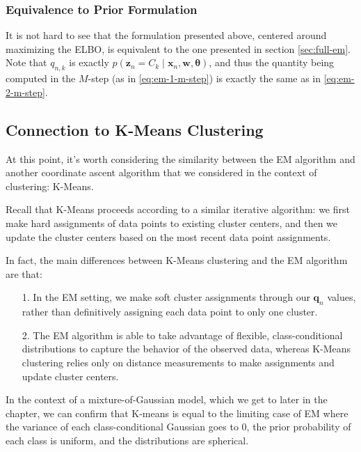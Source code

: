 
\subsubsection{Equivalence to Prior Formulation}

It is not hard to see that the formulation presented above, centered around maximizing the ELBO, is equivalent to the one presented in section \ref{sec:full-em}. Note that $q_{n,k}$ is exactly $p(\mathbf{z}_n = C_k \mid \mathbf{x}_n, \mathbf{w}, \boldsymbol{\theta})$, and thus the quantity being computed in the $M$-step (as in \eqref{eq:em-1-m-step}) is exactly the same as in \eqref{eq:em-2-m-step}. 

\subsection{Connection to K-Means Clustering}

At this point, it's worth considering the similarity between the EM algorithm and another coordinate ascent algorithm that we considered in the context of clustering: K-Means.

Recall that K-Means proceeds according to a similar iterative algorithm: we first make hard assignments of data points to existing cluster centers, and then we update the cluster centers based on the most recent data point assignments.

In fact, the main differences between K-Means clustering and the EM algorithm are that:
\begin{itemize}
    \item[1.] In the EM setting, we make soft cluster assignments through our $\textbf{q}_n$ values, rather than definitively assigning each data point to only one cluster.
    \item[2.] The EM algorithm is able to take advantage of flexible, class-conditional distributions 
      to capture the behavior of the observed data, whereas K-Means clustering relies only on distance measurements to make assignments and update cluster centers.
    \end{itemize}

    In the context of a mixture-of-Gaussian model, which we get to later in the chapter, we can confirm that K-means is equal to the limiting case of EM where the variance of each class-conditional Gaussian goes to 0, the prior probability of each class is uniform, and the distributions are spherical.

